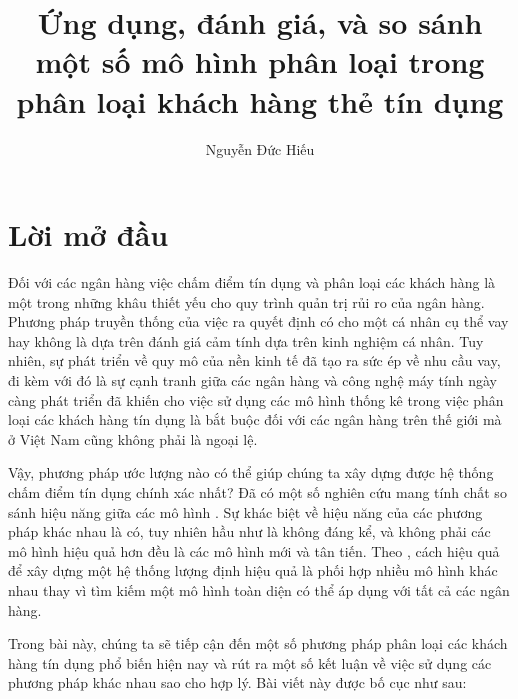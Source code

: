 \documentclass[a4paper]{report}\usepackage[]{graphicx}\usepackage[]{color}
\title{Ứng dụng, đánh giá, và so sánh một số mô hình phân loại trong phân loại khách hàng thẻ tín dụng}\let\Title\@title
\author{Nguyễn Đức Hiếu}\let\Author\@author
\begin{document}




\clearpage\tableofcontents
{}

\listoffigures
{}

\begingroup
\let\clearpage\relax
\listoftables
{}
\endgroup




\chapter*{Lời mở đầu}

%
Đối với các ngân hàng việc chấm điểm tín dụng và phân loại các khách hàng là một trong những khâu thiết yếu cho quy trình quản trị rủi ro của ngân hàng.
%
Phương pháp truyền thống của việc ra quyết định có cho một cá nhân cụ thể vay hay không là dựa trên đánh giá cảm tính dựa trên kinh nghiệm cá nhân.
%
Tuy nhiên, sự phát triển về quy mô của nền kinh tế đã tạo ra sức ép về nhu cầu vay, đi kèm với đó là sự cạnh tranh giữa các ngân hàng và công nghệ máy tính ngày càng phát triển đã khiến cho việc sử dụng các mô hình thống kê trong việc phân loại các khách hàng tín dụng là bắt buộc đối với các ngân hàng trên thế giới mà ở Việt Nam cũng không phải là ngoại lệ.
%

Vậy, phương pháp ước lượng nào có thể giúp chúng ta xây dựng được hệ thống chấm điểm tín dụng chính xác nhất? Đã có một số nghiên cứu mang tính chất so sánh hiệu năng giữa các mô hình \parencite{baesens2003benchmarking, xiao2006comparative, lessmann2015benchmarking}. 
Sự khác biệt về hiệu năng của các phương pháp khác nhau là có, tuy nhiên hầu như là không đáng kể, và không phải các mô hình hiệu quả hơn đều là các mô hình mới và tân tiến.
Theo \textcite{thomas2010consumer}, cách hiệu quả để xây dựng một hệ thống lượng định hiệu quả là phối hợp nhiều mô hình khác nhau thay vì tìm kiếm một mô hình toàn diện có thể áp dụng với tất cả các ngân hàng.

Trong bài này, chúng ta sẽ tiếp cận đến một số phương pháp phân loại các khách hàng tín dụng phổ biến hiện nay và rút ra một số kết luận về việc sử dụng các phương pháp khác nhau sao cho hợp lý. Bài viết này được bố cục như sau:
\end{document}
